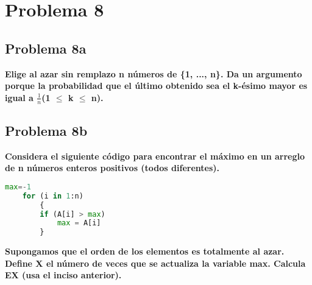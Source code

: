 \section*{Problema 8}
\subsection*{Problema 8a}
\textbf{Elige al azar sin remplazo n números de \{1, ..., n\}. Da un argumento porque la probabilidad que el último obtenido sea el k-ésimo mayor es igual a $\frac{1}{n}$(1 $\leq$ k $\leq$ n).}
\subsection*{Problema 8b}
\textbf{Considera el siguiente código para encontrar el máximo en un arreglo
    de n números enteros positivos (todos diferentes).}
\begin{lstlisting}[language=python]
    max=-1
    for (i in 1:n)
        {
        if (A[i] > max)
            max = A[i]
        }
\end{lstlisting}
\textbf{Supongamos que el orden de los elementos es totalmente al azar. Define X el número de veces que se actualiza la variable max. Calcula EX (usa el inciso anterior).}
